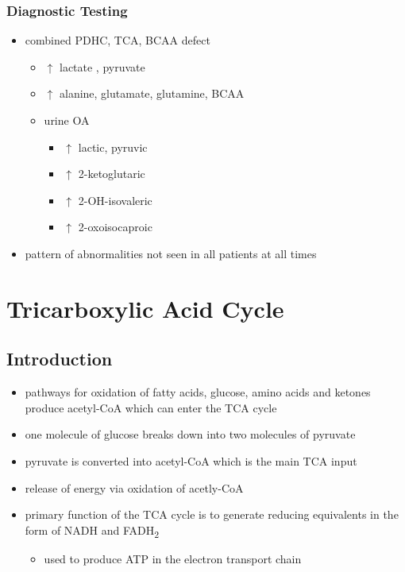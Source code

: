 \documentclass{scrartcl}
\begin{document}
\subsubsection{Diagnostic Testing}
\label{sec:orgbe7e878}
\begin{itemize}
\item combined PDHC, TCA, BCAA defect
\begin{itemize}
\item \(\uparrow\) lactate , pyruvate
\item \(\uparrow\) alanine, glutamate, glutamine, BCAA
\item urine OA
\begin{itemize}
\item \(\uparrow\) lactic, pyruvic
\item \(\uparrow\) 2-ketoglutaric
\item \(\uparrow\) 2-OH-isovaleric
\item \(\uparrow\) 2-oxoisocaproic
\end{itemize}
\end{itemize}
\item pattern of abnormalities not seen in all patients at all times
\end{itemize}
\section{Tricarboxylic Acid Cycle}
\label{sec:org2d6f716}
\subsection{Introduction}
\label{sec:org0be108f}
\begin{itemize}
\item pathways for oxidation of fatty acids, glucose, amino acids and
ketones produce acetyl-CoA which can enter the TCA cycle
\item one molecule of glucose breaks down into two molecules of pyruvate
\item pyruvate is converted into acetyl-CoA which is the main TCA input
\item release of energy via oxidation of acetly-CoA
\item primary function of the TCA cycle is to generate reducing
equivalents in the form of NADH and FADH\textsubscript{2}
\begin{itemize}
\item used to produce ATP in the electron transport chain
\end{itemize}
\end{itemize}
\end{document}
